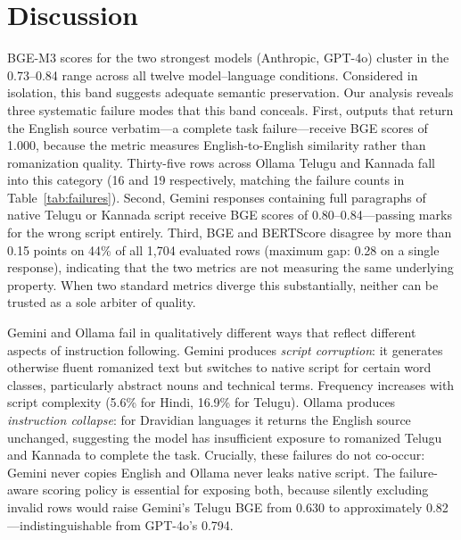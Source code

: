 \section{Discussion}
\label{sec:discussion}

\enspace
BGE-M3 scores for the two strongest models (Anthropic, GPT-4o) cluster in the
0.73--0.84 range across all twelve model--language conditions. Considered in isolation,
this band suggests adequate semantic preservation. Our analysis reveals three
systematic failure modes that this band conceals. First, outputs that return
the English source verbatim---a complete task failure---receive BGE scores of
1.000, because the metric measures English-to-English similarity rather than
romanization quality. Thirty-five rows across Ollama Telugu and Kannada fall
into this category (16 and 19 respectively, matching the failure counts in Table~\ref{tab:failures}). Second, Gemini responses containing full paragraphs of
native Telugu or Kannada script receive BGE scores of 0.80--0.84---passing
marks for the wrong script entirely. Third, BGE and BERTScore disagree by
more than 0.15 points on 44\% of all 1,704 evaluated rows (maximum gap: 0.28
on a single response), indicating that the two metrics are not measuring the
same underlying property. When two standard metrics diverge this substantially,
neither can be trusted as a sole arbiter of quality.

\enspace
Gemini and Ollama fail in qualitatively different ways that reflect different
aspects of instruction following. Gemini produces \emph{script corruption}:
it generates otherwise fluent romanized text but switches to native script for
certain word classes, particularly abstract nouns and technical terms.
Frequency increases with script complexity (5.6\% for Hindi, 16.9\% for
Telugu). Ollama produces \emph{instruction collapse}: for Dravidian languages
it returns the English source unchanged, suggesting the model has insufficient
exposure to romanized Telugu and Kannada to complete the task. Crucially,
these failures do not co-occur: Gemini never copies English and Ollama never
leaks native script. The failure-aware scoring policy is essential for exposing
both, because silently excluding invalid rows would raise Gemini's Telugu BGE
from 0.630 to approximately 0.82---indistinguishable from GPT-4o's 0.794.

